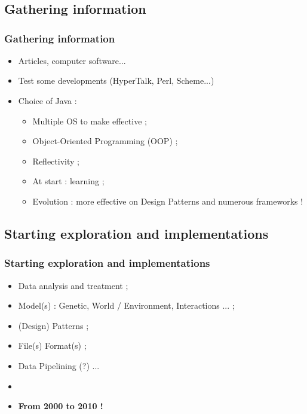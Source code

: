 \documentclass{beamer}
\begin{document}
\section{\titleSectionSecondPart }
\begin{frame}
	\frametitle{\titleSectionFirstPart }
	\tableofcontents[sections=2,currentsection,subsectionstyle=show/shaded/hide]
\end{frame} 

\def\titleSubSectionSecondPartOne{ Gathering information }
\subsection{ \titleSubSectionSecondPartOne }
\begin{frame}
	\frametitle{ \titleSubSectionSecondPartOne }
	\begin{itemize}
		\item Articles, computer software...
		\item Test some developments (HyperTalk, Perl, Scheme...)
		\item Choice of Java : 
		\begin{itemize}
			\item Multiple OS to make effective ; 
			\item Object-Oriented Programming (OOP) ; 
			\item Reflectivity ; 
			\item At start : learning ;
			\item Evolution : more effective on Design Patterns and numerous frameworks !
		\end{itemize}
	\end{itemize}
\end{frame}

\def\titleSubSectionSecondPartTwo{ Starting exploration and implementations }
\subsection{ \titleSubSectionSecondPartTwo }
\begin{frame}
	\frametitle{ \titleSubSectionSecondPartTwo }
	\begin{itemize}
		\item Data analysis and treatment ; 
		\item Model(s) : Genetic, World / Environment, Interactions ... ; 
		\item (Design) Patterns ; 
		\item File(s) Format(s) ; 
		\item Data Pipelining (?) ...
		\item[] 
		\item \textbf{From 2000 to 2010 !} 
	\end{itemize}
\end{frame}
\end{document}

